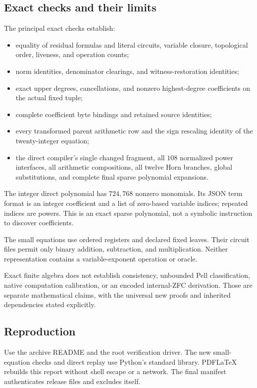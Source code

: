 \documentclass[11pt,letterpaper]{article}
\theoremstyle{remark}\newtheorem{remark}[theorem]{Remark}
\begin{document}
\subsection{Exact checks and their limits}
The principal exact checks establish:
\begin{itemize}
\item equality of residual formulas and literal circuits, variable closure,
topological order, liveness, and operation counts;
\item norm identities, denominator clearings, and witness-restoration
identities;
\item exact upper degrees, cancellations, and nonzero highest-degree
coefficients on the actual fixed tuple;
\item complete coefficient byte bindings and retained source identities;
\item every transformed parent arithmetic row and the sign rescaling
identity of the twenty-integer equation;
\item the direct compiler's single changed fragment, all $108$ normalized
power interfaces, all arithmetic compositions, all twelve Horn branches,
global substitutions, and complete final sparse polynomial expansions.
\end{itemize}
The integer direct polynomial has $724{,}768$ nonzero monomials. Its
JSON term format is an integer coefficient and a list of zero-based variable
indices; repeated indices are powers. This is an exact sparse polynomial,
not a symbolic instruction to discover coefficients.

The small equations use ordered registers and declared fixed leaves.
Their circuit files permit only binary addition, subtraction, and
multiplication. Neither representation contains a variable-exponent
operation or oracle.

Exact finite algebra does not establish consistency, unbounded Pell
classification, native computation calibration, or an encoded internal-ZFC
derivation. Those are separate mathematical claims, with the universal
new proofs and inherited dependencies stated explicitly.

\subsection{Reproduction}
Use the archive README and the root verification driver.
The new small-equation checks and direct replay use Python's standard
library. PDFLaTeX rebuilds this report without shell escape or a network.
The final manifest authenticates release files and excludes itself.
\end{document}
